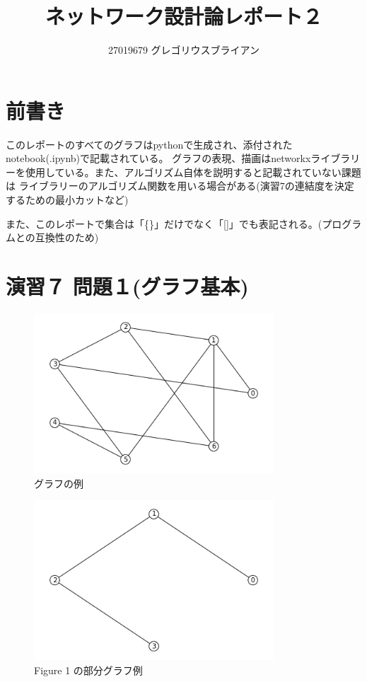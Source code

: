 \documentclass{report}
\title{ネットワーク設計論レポート２}
\author{27019679 グレゴリウスブライアン}
\begin{document}
\begin{CJK}{UTF8}{min}
    \maketitle
    \section*{前書き}
    このレポートのすべてのグラフはpythonで生成され、添付されたnotebook(.ipynb)で記載されている。
    グラフの表現、描画はnetworkxライブラリーを使用している。また、アルゴリズム自体を説明すると記載されていない課題は
    ライブラリーのアルゴリズム関数を用いる場合がある(演習7の連結度を決定するための最小カットなど)

    また、このレポートで集合は「\{\}」だけでなく「[]」でも表記される。(プログラムとの互換性のため)
    \newpage
    \section*{演習７ 問題１(グラフ基本)}

    \begin{figure}[!h]
        \centerline{\includegraphics[width=0.8\textwidth]{data/1.png}}
        \caption{グラフの例}
    \end{figure}


    \begin{figure}[!h]
        \centerline{\includegraphics[width=0.8\textwidth]{data/2.png}}
        \caption{Figure 1 の部分グラフ例}
    \end{figure}



\end{CJK}
\end{document}
